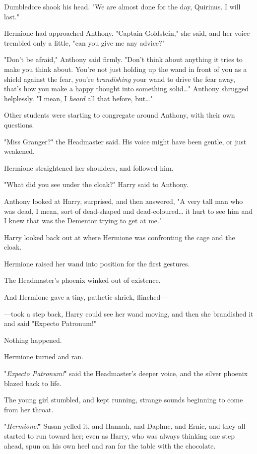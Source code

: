Dumbledore shook his head. "We are almost done for the day, Quirinus. I will
last."

Hermione had approached Anthony. "Captain Goldstein," she said, and her voice
trembled only a little, "can you give me any advice?"

"Don't be afraid," Anthony said firmly. "Don't think about anything it tries to
make you think about. You're not just holding up the wand in front of you as a
shield against the fear, you're \emph{brandishing} your wand to drive the fear
away, that's how you make a happy thought into something solid{\ldots}" Anthony
shrugged helplessly. "I mean, I \emph{heard} all that before, but{\ldots}"

Other students were starting to congregate around Anthony, with their own
questions.

"Miss Granger?" the Headmaster said. His voice might have been gentle, or just
weakened.

Hermione straightened her shoulders, and followed him.

"What did you see under the cloak?" Harry said to Anthony.

Anthony looked at Harry, surprised, and then answered, "A very tall man who was
dead, I mean, sort of dead-shaped and dead-coloured{\ldots} it hurt to see him
and I knew that was the Dementor trying to get at me."

Harry looked back out at where Hermione was confronting the cage and the cloak.

Hermione raised her wand into position for the first gestures.

The Headmaster's phoenix winked out of existence.

And Hermione gave a tiny, pathetic shriek, flinched---

---took a step back, Harry could see her wand moving, and then she brandished
it and said "Expecto Patronum!"

Nothing happened.

Hermione turned and ran.

"\emph{Expecto Patronum!}" said the Headmaster's deeper voice, and the silver
phoenix blazed back to life.

The young girl stumbled, and kept running, strange sounds beginning to come
from her throat.

"\emph{Hermione!}" Susan yelled it, and Hannah, and Daphne, and Ernie, and they
all started to run toward her; even as Harry, who was always thinking one step
ahead, spun on his own heel and ran for the table with the chocolate.

